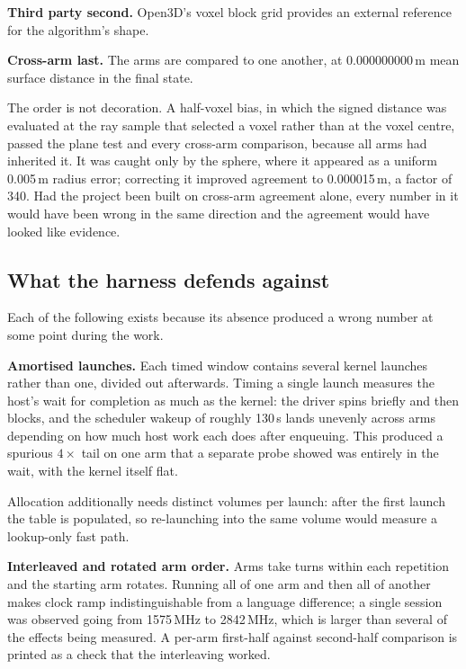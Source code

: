\documentclass[11pt]{article}
\begin{document}
\textbf{Third party second.} Open3D's voxel block grid provides an external
reference for the algorithm's shape.

\textbf{Cross-arm last.} The arms are compared to one another, at 0.000000000\,m
mean surface distance in the final state.

The order is not decoration. A half-voxel bias, in which the signed distance was
evaluated at the ray sample that selected a voxel rather than at the voxel
centre, passed the plane test and every cross-arm comparison, because all arms
had inherited it. It was caught only by the sphere, where it appeared as a
uniform 0.005\,m radius error; correcting it improved agreement to 0.000015\,m, a
factor of 340. Had the project been built on cross-arm agreement alone, every
number in it would have been wrong in the same direction and the agreement would
have looked like evidence.

\subsection{What the harness defends against}

Each of the following exists because its absence produced a wrong number at some
point during the work.

\textbf{Amortised launches.} Each timed window contains several kernel launches
rather than one, divided out afterwards. Timing a single launch measures the
host's wait for completion as much as the kernel: the driver spins briefly and
then blocks, and the scheduler wakeup of roughly 130\,\textmu s lands unevenly
across arms depending on how much host work each does after enqueuing. This
produced a spurious $4\times$ tail on one arm that a separate probe showed was
entirely in the wait, with the kernel itself flat.

Allocation additionally needs distinct volumes per launch: after the first
launch the table is populated, so re-launching into the same volume would measure
a lookup-only fast path.

\textbf{Interleaved and rotated arm order.} Arms take turns within each
repetition and the starting arm rotates. Running all of one arm and then all of
another makes clock ramp indistinguishable from a language difference; a single
session was observed going from 1575\,MHz to 2842\,MHz, which is larger than
several of the effects being measured. A per-arm first-half against second-half
comparison is printed as a check that the interleaving worked.
\end{document}
